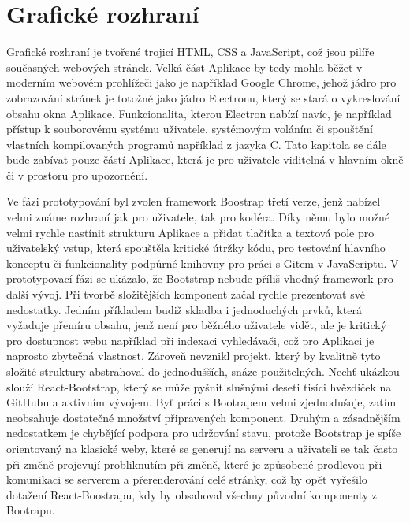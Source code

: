 \chapter{Grafické rozhraní}

Grafické rozhraní je tvořené trojicí HTML, CSS a JavaScript, což jsou pilíře současných webových stránek. Velká část Aplikace by tedy mohla běžet v moderním webovém prohlížeči jako je například Google Chrome, jehož jádro pro zobrazování stránek je totožné jako jádro Electronu, který se stará o vykreslování obsahu okna Aplikace. Funkcionalita, kterou Electron nabízí navíc, je například přístup k souborovému systému uživatele, systémovým voláním či spouštění vlastních kompilovaných programů například z jazyka C. Tato kapitola se dále bude zabívat pouze částí Aplikace, která je pro uživatele viditelná v hlavním okně či v prostoru pro upozornění.

Ve fázi prototypování byl zvolen framework Boostrap třetí verze, jenž nabízel velmi známe rozhraní jak pro uživatele, tak pro kodéra. Díky němu bylo možné velmi rychle nastínit strukturu Aplikace a přidat tlačítka a textová pole pro uživatelský vstup, která spouštěla kritické útržky kódu, pro testování hlavního konceptu či funkcionality podpůrné knihovny pro práci s Gitem v JavaScriptu. V prototypovací fázi se ukázalo, že Bootstrap nebude příliš vhodný framework pro další vývoj. Při tvorbě složitějších komponent začal rychle prezentovat své nedostatky. Jedním příkladem budiž skladba i jednoduchých prvků, která vyžaduje přemíru obsahu, jenž není pro běžného uživatele vidět, ale je kritický pro dostupnost webu například při indexaci vyhledávači, což pro Aplikaci je naprosto zbytečná vlastnost. Zároveň nevznikl projekt, který by kvalitně tyto složité struktury abstrahoval do jednodušších, snáze použitelných. Nechť ukázkou slouží React-Bootstrap, který se může pyšnit slušnými deseti tisíci hvězdiček na GitHubu a aktivním vývojem. Byť práci s Bootrapem velmi zjednodušuje, zatím neobsahuje dostatečné množství připravených komponent. Druhým a zásadnějším nedostatkem je chybějící podpora pro udržování stavu, protože Bootstrap je spíše orientovaný na klasické weby, které se generují na serveru a uživateli se tak často při změně projevují probliknutím při změně, které je způsobené prodlevou při komunikaci se serverem a přerenderování celé stránky, což by opět vyřešilo dotažení React-Boostrapu, kdy by obsahoval všechny původní komponenty z Bootrapu.

